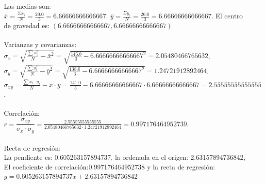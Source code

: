 \documentclass[addpoints,spanish, 12pt,a4paper]{exam}
\begin{document}
\begin{questions}
\begin{parts}
\begin{solution}
\\ \\ Las medias son: \\$\overline{x}=\frac{\Sigma{x_i}}{N}=\frac{20.0}{3}=6.66666666666667$. $\overline{y}=\frac{\Sigma{y_i}}{N}=\frac{20.0}{3}=6.66666666666667$.  El centro de gravedad es: $(6.66666666666667,6.66666666666667)$ \\ \\ Varianzas y covarianzas: \\ $\sigma_x=\sqrt{\frac{\sum{x_i^2}}{N}-\overline{x}^2}=\sqrt{\frac{146.0}{3}-6.66666666666667^2}=2.05480466765632$.\\ $\sigma_y=\sqrt{\frac{\sum{y_i^2}}{N}-\overline{y}^2}=\sqrt{\frac{138.0}{3}-6.66666666666667^2}=1.24721912892464$.\\ $\sigma_{xy}=\frac{\sum{x_i \cdot y_i}}{N}-\overline{x}\cdot \overline{y}=\frac{141.0}{3}-6.66666666666667\cdot 6.66666666666667=2.55555555555555$. \\ \\ Correlación: \\ $r=\dfrac{\sigma_{xy}}{\sigma_x \cdot \sigma_y}=\frac{2.55555555555555}{2.05480466765632\cdot 1.24721912892464}=0.997176464952739$. \\ \\ Recta de regresión: \\ La pendiente es: 0.605263157894737, la ordenada en el origen: 2.63157894736842, El coeficiente de correlación:0.997176464952738 y la recta de regresión: $y = 0.605263157894737 x + 2.63157894736842$
\end{solution}

\end{parts}
\end{questions}
\end{document}
